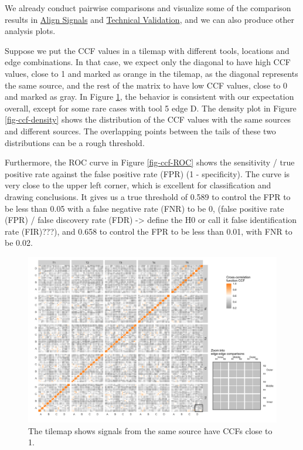 \documentclass[fleqn,10pt]{wlscirep}
\newcommand{\tom}[1]{{\textcolor{RedOrange}{#1}}}
\begin{document}
We already conduct pairwise comparisons and visualize some of the
comparison results in \hyperref[sec-align-signals]{Align Signals} and
\hyperref[sec-technical-validation]{Technical Validation}, and we can
also produce other analysis plots.

Suppose we put the CCF values in a tilemap with different tools,
locations and edge combinations. In that case, we expect only the
diagonal to have high CCF values, close to 1 and marked as orange in the
tilemap, as the diagonal represents the same source, and the rest of the
matrix to have low CCF values, close to 0 and marked as gray. In Figure
\ref{fig-ccf-tilemap}, the behavior is consistent with our expectation
overall, except for some rare cases with tool 5 edge D. The density plot
in Figure \ref{fig-ccf-density} shows the distribution of the CCF values
with the same sources and different sources. The overlapping points
between the tails of these two distributions can be a rough threshold.

Furthermore, the ROC curve in Figure \ref{fig-ccf-ROC} shows the
sensitivity / true positive rate against the false positive rate (FPR)
(1 - specificity). The curve is very close to the upper left corner,
which is excellent for classification and drawing conclusions. It gives
us a true threshold of 0.589 to control the FPR to be less than 0.05
with a false negative rate (FNR) to be 0,
\tom{(false positive rate (FPR) / false discovery rate (FDR) -> define the H0 or call it false identification rate (FIR)???)},
and 0.658 to control the FPR to be less than 0.01, with FNR to be 0.02.

\begin{figure}[ht]
\centering
\includegraphics[width=0.8\linewidth]{ccf_tilemap.png}
\caption{The tilemap shows signals from the same source have CCFs close to 1.}
\label{fig-ccf-tilemap}
\end{figure}
\end{document}
